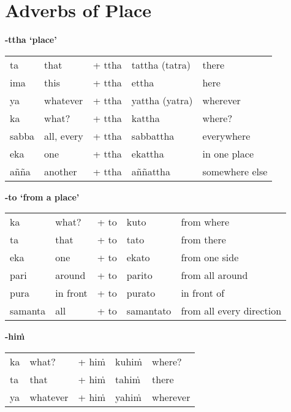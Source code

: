 \documentclass[11pt,oneside]{memoir}
\begin{document}
\clearpage

\section{Adverbs of Place}
\label{sec:orgfb21f91}

\textbf{-ttha `place'}

\begin{center}
\begin{tabular}{lllll}
ta & that & + ttha & tattha (tatra) & there\\[0pt]
ima & this & + ttha & ettha & here\\[0pt]
ya & whatever & + ttha & yattha (yatra) & wherever\\[0pt]
ka & what? & + ttha & kattha & where?\\[0pt]
sabba & all, every & + ttha & sabbattha & everywhere\\[0pt]
eka & one & + ttha & ekattha & in one place\\[0pt]
añña & another & + ttha & aññattha & somewhere else\\[0pt]
\end{tabular}
\end{center}

\textbf{-to `from a place'}

\begin{center}
\begin{tabular}{lllll}
ka & what? & + to & kuto & from where\\[0pt]
ta & that & + to & tato & from there\\[0pt]
eka & one & + to & ekato & from one side\\[0pt]
pari & around & + to & parito & from all around\\[0pt]
pura & in front & + to & purato & in front of\\[0pt]
samanta & all & + to & samantato & from all every direction\\[0pt]
\end{tabular}
\end{center}

\textbf{-hiṁ}

\begin{center}
\begin{tabular}{lllll}
ka & what? & + hiṁ & kuhiṁ & where?\\[0pt]
ta & that & + hiṁ & tahiṁ & there\\[0pt]
ya & whatever & + hiṁ & yahiṁ & wherever\\[0pt]
\end{tabular}
\end{center}
\end{document}
